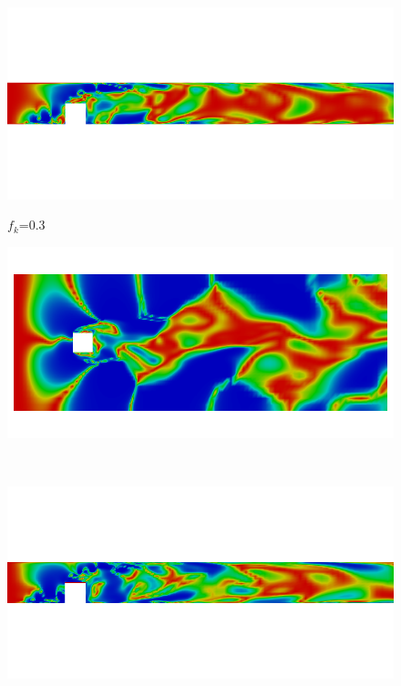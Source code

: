 \begin{figure}[H]
\ContinuedFloat
\begin{minipage}[b]{0.5\linewidth}
\includegraphics[scale=0.25]{figure/coarse/three/fkout_z.png}
\caption*{$f_k$=0.3}
\end{minipage}
\begin{minipage}[b]{0.5\linewidth}
\includegraphics[scale=0.25]{figure/coarse/three/fkout_y.png}
\caption*{}
\end{minipage}\\
\begin{minipage}[b]{0.5\linewidth}
\includegraphics[scale=0.25]{figure/coarse/two/fkout_z.png}

\end{minipage}
\end{figure}
